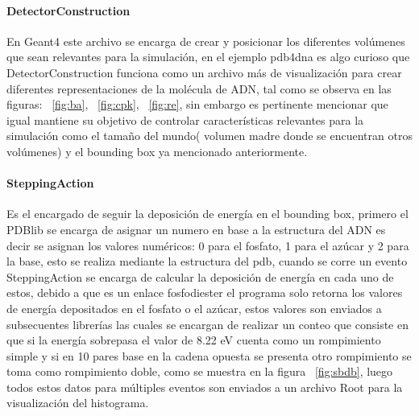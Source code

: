 \paragraph{DetectorConstruction}
En Geant4 este archivo se encarga de crear y posicionar los diferentes volúmenes que sean relevantes para la simulación, en el ejemplo pdb4dna es algo curioso que DetectorConstruction funciona como un archivo más de visualización para crear diferentes representaciones de la molécula de ADN, tal como se observa en las figuras: ~\ref{fig:ba}, ~\ref{fig:cpk}, ~\ref{fig:re}, sin embargo es pertinente mencionar que igual mantiene su objetivo de controlar características relevantes para la simulación como el tamaño del mundo( volumen madre donde se encuentran otros volúmenes) y el bounding box ya mencionado anteriormente.


\paragraph{SteppingAction}
Es el encargado de seguir la deposición de energía en el bounding box, primero el PDBlib se encarga de asignar un numero en base a la estructura del ADN es decir se asignan los valores numéricos: 0 para el fosfato, 1 para el azúcar y 2 para la base, esto se realiza mediante la estructura del pdb, cuando se corre un evento SteppingAction se encarga de calcular la deposición de energía en cada uno de estos, debido a que es un enlace fosfodiester el programa solo retorna los valores de energía depositados en el fosfato o el azúcar, estos valores son enviados a subsecuentes librerías las cuales se encargan de realizar un conteo que consiste en que si la energía sobrepasa el valor de 8.22 eV cuenta como un rompimiento simple y si en 10 pares base en la cadena opuesta se presenta otro rompimiento se toma como rompimiento doble, como se muestra en la figura ~\ref{fig:sbdb}, luego todos estos datos para múltiples eventos son enviados a un archivo Root para la visualización del histograma.
